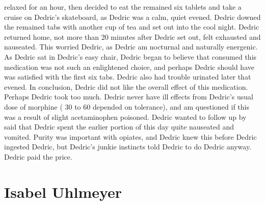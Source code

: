 \documentclass[12pt]{book}
\begin{document}
relaxed for an hour, then decided to eat the remained six tablets and take a cruise on Dedric's skateboard, as Dedric was a calm, quiet evened. Dedric downed the remained tabs with another cup of tea and set out into the cool night. Dedric returned home, not more than 20 minutes after Dedric set out, felt exhausted and nauseated. This worried Dedric, as Dedric am nocturnal and naturally energenic. As Dedric sat in Dedric's easy chair, Dedric began to believe that consumed this medication was not such an enlightened choice, and perhaps Dedric should have was satisfied with the first six tabs. Dedric also had trouble urinated later that evened. In conclusion, Dedric did not like the overall effect of this medication. Perhaps Dedric took too much. Dedric never have ill effects from Dedric's usual dose of morphine ( 30 to 60 depended on tolerance), and am questioned if this was a result of slight acetaminophen poisoned. Dedric wanted to follow up by said that Dedric spent the earlier portion of this day quite nauseated and vomited. Purity was important with opiates, and Dedric knew this before Dedric ingested Dedric, but Dedric's junkie instincts told Dedric to do Dedric anyway. Dedric paid the price.



\chapter{Isabel Uhlmeyer}
\end{document}
